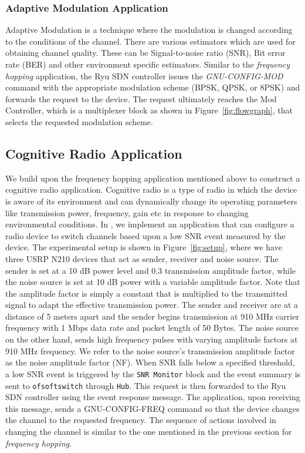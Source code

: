 \subsubsection{Adaptive Modulation Application}
Adaptive Modulation is a technique where the modulation is changed according to the conditions of the channel. There are various estimators which are used for obtaining channel quality. These can be Signal-to-noise ratio (SNR), Bit error rate (BER) and other environment specific estimators. 
Similar to the \emph{frequency hopping} application, the Ryu SDN controller issues the \emph{GNU-CONFIG-MOD} command with the appropriate modulation scheme (BPSK, QPSK, or 8PSK) and forwards the request to the device. The request ultimately reaches the Mod Controller, which is a multiplexer block as shown in Figure~\ref{fig:flowgraph}, that selects the requested modulation scheme. 

\subsection{Cognitive Radio Application}
We build upon the frequency hopping application mentioned above to construct a cognitive radio application. Cognitive radio is a type of radio in which the device is aware of its environment and can dynamically change its operating parameters like transmission power, frequency, gain etc in response to changing environmental conditions. In \crossflow, we implement an application that can configure a radio device to switch channels based upon a low SNR event measured by the device. The experimental setup is shown in Figure~\ref{fig:setup}, where we have three USRP N210 devices that act as sender, receiver and noise source. The sender is set at a 10 dB power level and 0.3 transmission amplitude factor, while the noise source is set at 10 dB power with a variable amplitude factor. Note that the amplitude factor is simply a constant that is multiplied to the transmitted signal to adapt the effective transmission power. The sender and receiver are at a distance of 5 meters apart and the sender begins transmission at 910 MHz carrier frequency with 1 Mbps data rate and packet length of 50 Bytes. The noise source on the other hand, sends high frequency pulses with varying amplitude factors at 910 MHz frequency. We refer to the noise source's transmission amplitude factor as the noise amplitude factor (NF). When SNR falls below a specified threshold, a low SNR event is triggered by the \texttt{SNR Monitor} block and the event summary is sent to \texttt{ofsoftswitch} through \texttt{\crossflow Hub}. This request is then forwarded to the Ryu SDN controller using the event response message. The application, upon receiving this message, sends a {GNU-CONFIG-FREQ} command so that the device changes the channel to the requested frequency. The sequence of actions involved in changing the channel is similar to the one mentioned in the previous section for \emph{frequency hopping}.

